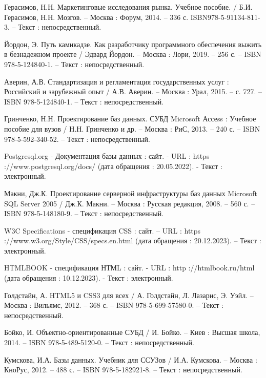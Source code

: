 \begin{thebibliography}{20}
     Герасимов, Н.Н. Маркетинговые исследования рынка. Учебное пособие. / Б.И. Герасимов, Н.Н. Мозгов. – Москва : Форум, 2014. – 336 с. ISBN978-5-91134-811-3. – Текст : непосредственный.

     Йордон, Э. Путь камикадзе. Как разработчику программного обеспечения выжить в безнадежном проекте / Эдвард Йордон. – Москва : Лори, 2019. – 256 с. – ISBN 978-5-124840-1. – Текст : непосредственный.%

     Аверин, А.В. Стандартизация и регламентация государственных услуг : Российский и зарубежный опыт / А.В. Аверин. – Москва : Урал, 2015. – с. 727. – ISBN 978-5-124840-1. – Текст : непосредственный.%

     Гринченко, Н.Н. Проектирование баз данных. СУБД Microsoft Ассеss : Учебное пособие для вузов / Н.Н. Гринченко и др. – Москва : РиС, 2013. – 240 с. – ISBN 978-5-592-340-52. – Текст : непосредственный.%

     Postgresql.org -\- Документация базы данных : сайт. - URL : https ://www.postgresql.org/docs/ (дата обращения : 20.05.2022). - Текст : электронный.

     Макни, Дж.К. Проектирование серверной инфраструктуры баз данных Microsoft SQL Server 2005 / Дж.К. Макни. – Москва : Русская редакция, 2008. – 560 с. – ISBN 978-5-148180-9. – Текст : непосредственный.%

     W3C Specifications -\- спецификация CSS : сайт. – URL : https ://www.w3.org/Style/CSS/specs.en.html (дата обращения : 20.12.2023). – Текст : электронный.

     HTMLBOOK -\- спецификация НТМL : сайт. - URL : http ://htmlbook.ru/html (дата обращения : 10.12.2023). - Текст : электронный.

 		Голдстайн, А. HTML5 и CSS3 для всех / А. Голдстайн, Л. Лазарис, Э. Уэйл. – Москва : Вильямс, 2012. – 368 с. – ISBN 978-5-699-57580-0. – Текст : непосредственный.

     Бойко, И. Объектно-ориентированные СУБД / И. Бойко. – Киев : Высшая школа, 2014. – ISBN 978-5-489-5120-0. – Текст : непосредственный.%

     Кумскова, И.А. Базы данных. Учебник для ССУЗов / И.А. Кумскова. – Москва : КноРус, 2012. – 488 с. – ISBN 978-5-182921-8. – Текст : непосредственный.%


\end{thebibliography}
